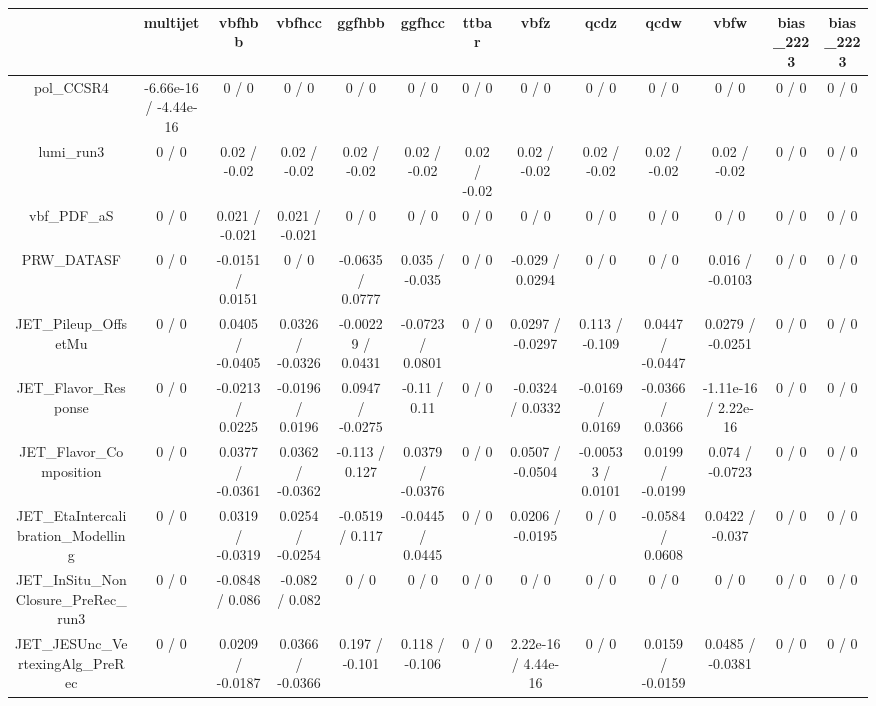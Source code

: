 \documentclass[10pt]{article}
\begin{document}
\begin{table}[htbp]
\begin{center}
\begin{tabular}{|c|c|c|c|c|c|c|c|c|c|c|c|c|}
\hline 
      & multijet      & vbfhbb      & vbfhcc      & ggfhbb      & ggfhcc      & ttbar      & vbfz      & qcdz      & qcdw      & vbfw      & bias_2223      & bias_2223 \\ 
\hline 
  pol_CCSR4 & -6.66e-16 / -4.44e-16 & 0 / 0 & 0 / 0 & 0 / 0 & 0 / 0 & 0 / 0 & 0 / 0 & 0 / 0 & 0 / 0 & 0 / 0 & 0 / 0 & 0 / 0 \\ 
  lumi_run3 & 0 / 0 & 0.02 / -0.02 & 0.02 / -0.02 & 0.02 / -0.02 & 0.02 / -0.02 & 0.02 / -0.02 & 0.02 / -0.02 & 0.02 / -0.02 & 0.02 / -0.02 & 0.02 / -0.02 & 0 / 0 & 0 / 0 \\ 
  vbf_PDF_aS & 0 / 0 & 0.021 / -0.021 & 0.021 / -0.021 & 0 / 0 & 0 / 0 & 0 / 0 & 0 / 0 & 0 / 0 & 0 / 0 & 0 / 0 & 0 / 0 & 0 / 0 \\ 
  PRW_DATASF & 0 / 0 & -0.0151 / 0.0151 & 0 / 0 & -0.0635 / 0.0777 & 0.035 / -0.035 & 0 / 0 & -0.029 / 0.0294 & 0 / 0 & 0 / 0 & 0.016 / -0.0103 & 0 / 0 & 0 / 0 \\ 
  JET_Pileup_OffsetMu & 0 / 0 & 0.0405 / -0.0405 & 0.0326 / -0.0326 & -0.00229 / 0.0431 & -0.0723 / 0.0801 & 0 / 0 & 0.0297 / -0.0297 & 0.113 / -0.109 & 0.0447 / -0.0447 & 0.0279 / -0.0251 & 0 / 0 & 0 / 0 \\ 
  JET_Flavor_Response & 0 / 0 & -0.0213 / 0.0225 & -0.0196 / 0.0196 & 0.0947 / -0.0275 & -0.11 / 0.11 & 0 / 0 & -0.0324 / 0.0332 & -0.0169 / 0.0169 & -0.0366 / 0.0366 & -1.11e-16 / 2.22e-16 & 0 / 0 & 0 / 0 \\ 
  JET_Flavor_Composition & 0 / 0 & 0.0377 / -0.0361 & 0.0362 / -0.0362 & -0.113 / 0.127 & 0.0379 / -0.0376 & 0 / 0 & 0.0507 / -0.0504 & -0.00533 / 0.0101 & 0.0199 / -0.0199 & 0.074 / -0.0723 & 0 / 0 & 0 / 0 \\ 
  JET_EtaIntercalibration_Modelling & 0 / 0 & 0.0319 / -0.0319 & 0.0254 / -0.0254 & -0.0519 / 0.117 & -0.0445 / 0.0445 & 0 / 0 & 0.0206 / -0.0195 & 0 / 0 & -0.0584 / 0.0608 & 0.0422 / -0.037 & 0 / 0 & 0 / 0 \\ 
  JET_InSitu_NonClosure_PreRec_run3 & 0 / 0 & -0.0848 / 0.086 & -0.082 / 0.082 & 0 / 0 & 0 / 0 & 0 / 0 & 0 / 0 & 0 / 0 & 0 / 0 & 0 / 0 & 0 / 0 & 0 / 0 \\ 
  JET_JESUnc_VertexingAlg_PreRec & 0 / 0 & 0.0209 / -0.0187 & 0.0366 / -0.0366 & 0.197 / -0.101 & 0.118 / -0.106 & 0 / 0 & 2.22e-16 / 4.44e-16 & 0 / 0 & 0.0159 / -0.0159 & 0.0485 / -0.0381 & 0 / 0 & 0 / 0 \\ 

\end{tabular}
\end{center}
\end{table}
\end{document}
